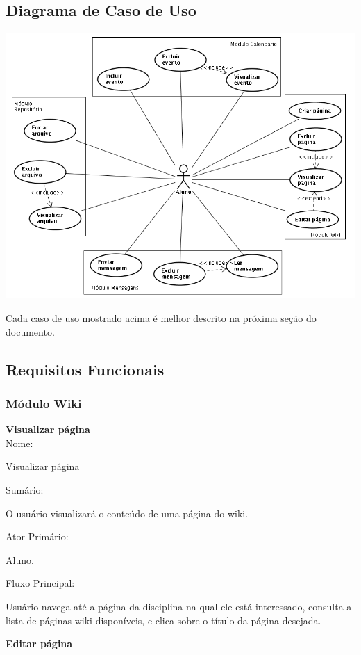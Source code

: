 \documentclass[11pt]{article}
\begin{document}
\subsection{Diagrama de Caso de Uso}
\includegraphics[width=1.20\textwidth]{usecase.png}

Cada caso de uso mostrado acima é melhor descrito na próxima seção do documento.

\subsection{Requisitos Funcionais}

\subsubsection{Módulo Wiki}
\textbf{Visualizar página}
\\

Nome:

      Visualizar página

Sumário:

      O usuário visualizará o conteúdo de uma página do wiki.

Ator Primário:

      Aluno. 

Fluxo Principal:

      Usuário navega até a página da disciplina na qual ele está interessado, consulta a lista de páginas wiki disponíveis, e clica sobre o título da página desejada. 

\textbf{Editar página}
\\
\end{document}
